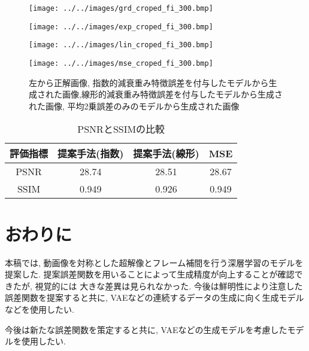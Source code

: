 \documentclass[twocolumn, a4j, uplatex]{jsarticle}
\begin{document}
\begin{figure}[htbp]
    \centering
    \begin{minipage}{0.23\hsize}
        \centering
        \texttt{[image: ../../images/grd\_croped\_fi\_300.bmp]}
    \end{minipage}
    \begin{minipage}{0.23\columnwidth}
        \centering
        \texttt{[image: ../../images/exp\_croped\_fi\_300.bmp]}
    \end{minipage}
    \begin{minipage}{0.23\columnwidth}
        \centering
        \texttt{[image: ../../images/lin\_croped\_fi\_300.bmp]}
    \end{minipage}
    \begin{minipage}{0.23\columnwidth}
        \centering
        \texttt{[image: ../../images/mse\_croped\_fi\_300.bmp]}
    \end{minipage}
    \caption{左から正解画像, 指数的減衰重み特徴誤差を付与したモデルから生成された画像,線形的減衰重み特徴誤差を付与したモデルから生成された画像, 平均2乗誤差のみのモデルから生成された画像}
    \label{fig:pic}
\end{figure}

\begin{table}[htbp]
    \caption{PSNRとSSIMの比較}
    \label{table:comp}
    \begin{tabular}{|c|c|c|c|}\hline
        評価指標 & 提案手法(指数) & 提案手法(線形)& MSE \\ \hline
        PSNR & 28.74 & 28.51  & 28.67 \\ \hline
        SSIM & 0.949 & 0.926 & 0.949 \\ \hline
    \end{tabular}
\end{table}


\section{おわりに}
本稿では, 動画像を対称とした超解像とフレーム補間を行う深層学習のモデルを提案した.
提案誤差関数を用いることによって生成精度が向上することが確認できたが, 視覚的には
大きな差異は見られなかった.
今後は鮮明性により注意した誤差関数を提案すると共に, VAEなどの連続するデータの生成に向く生成モデルなどを使用したい.

今後は新たな誤差関数を策定すると共に, VAEなどの生成モデルを考慮したモデルを使用したい.


\end{document}
